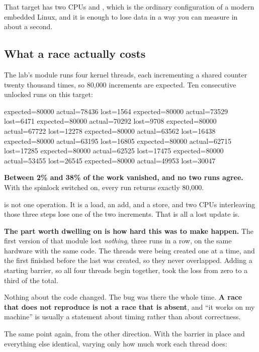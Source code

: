 That target has two CPUs and , which is the ordinary configuration of a
modern embedded Linux, and it is enough to lose data in a way you can measure in about a second.

\subsection{What a race actually costs}
\label{c7:app:a2}

The lab's  module runs four kernel threads, each incrementing a shared counter twenty
thousand times, so 80,000 increments are expected. Ten consecutive unlocked runs on this target:

\begin{console}
expected=80000 actual=78436 lost=1564
expected=80000 actual=73529 lost=6471
expected=80000 actual=70292 lost=9708
expected=80000 actual=67722 lost=12278
expected=80000 actual=63562 lost=16438
expected=80000 actual=63195 lost=16805
expected=80000 actual=62715 lost=17285
expected=80000 actual=62525 lost=17475
expected=80000 actual=53455 lost=26545
expected=80000 actual=49953 lost=30047
\end{console}

\noindent \textbf{Between 2\% and 38\% of the work vanished, and no two runs agree.} With the
spinlock switched on, every run returns exactly 80,000.

 is not one operation. It is a load, an add, and a store, and two CPUs interleaving
those three steps lose one of the two increments. That is all a lost update is.

\textbf{The part worth dwelling on is how hard this was to make happen.} The first version of that
module lost \emph{nothing}, three runs in a row, on the same hardware with the same code. The
threads were being created one at a time, and the first finished before the last was created, so
they never overlapped. Adding a starting barrier, so all four threads begin together, took the loss
from zero to a third of the total.

Nothing about the code changed. The bug was there the whole time. \textbf{A race that does not
reproduce is not a race that is absent}, and ``it works on my machine'' is usually a statement about
timing rather than about correctness.

The same point again, from the other direction. With the barrier in place and everything else
identical, varying only how much work each thread does:

